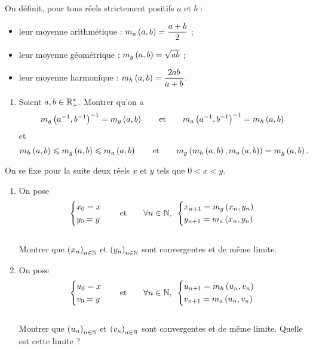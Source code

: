 \begin{exo}
On définit, pour tous réels strictement positifs \(a\) et \(b\) :

\begin{itemize}
\item leur moyenne arithmétique : \(m_a\left(a,b\right)=\dfrac{a+b}{2}\) ; \\

\item leur moyenne géométrique : \(m_g\left(a,b\right)=\sqrt{ab}\) ; \\

\item leur moyenne harmonique : \(m_h\left(a,b\right)=\dfrac{2ab}{a+b}\).
\end{itemize}

\begin{enumerate}[series=exmoyennes]
\item Soient \(a,b\in\mathbb{R}_+^*\). Montrer qu'on a \[m_g\left(a^{-1},b^{-1}\right)^{-1}=m_g\left(a,b\right)\qquad\text{et}\qquad m_a\left(a^{-1},b^{-1}\right)^{-1}=m_h\left(a,b\right)\] et \[m_h\left(a,b\right)\leqslant m_g\left(a,b\right)\leqslant m_a\left(a,b\right)\qquad\text{et}\qquad m_g\left(m_h\left(a,b\right),m_a\left(a,b\right)\right)=m_g\left(a,b\right).\]
\end{enumerate}

On se fixe pour la suite deux réels \(x\) et \(y\) tels que \(0<x<y\).

\begin{enumerate}[resume=exmoyennes]
\item On pose \[\begin{dcases}x_0=x \\ y_0=y\end{dcases}\qquad\text{et}\qquad\quantifs{\forall n\in\N}\begin{dcases}x_{n+1}=m_g\paren{x_n,y_n} \\ y_{n+1}=m_a\paren{x_n,y_n}\end{dcases}\] \\

Montrer que \(\left(x_n\right)_{n\in\mathbb{N}}\) et \(\left(y_n\right)_{n\in\mathbb{N}}\) sont convergentes et de même limite. \\

\item On pose \[\begin{dcases}u_0=x \\ v_0=y\end{dcases}\qquad\text{et}\qquad\quantifs{\forall n\in\N}\begin{dcases}u_{n+1}=m_h\paren{u_n,v_n} \\ v_{n+1}=m_a\paren{u_n,v_n}\end{dcases}\] \\

Montrer que \(\left(u_n\right)_{n\in\mathbb{N}}\) et \(\left(v_n\right)_{n\in\mathbb{N}}\) sont convergentes et de même limite. Quelle est cette limite ?
\end{enumerate}
\end{exo}

